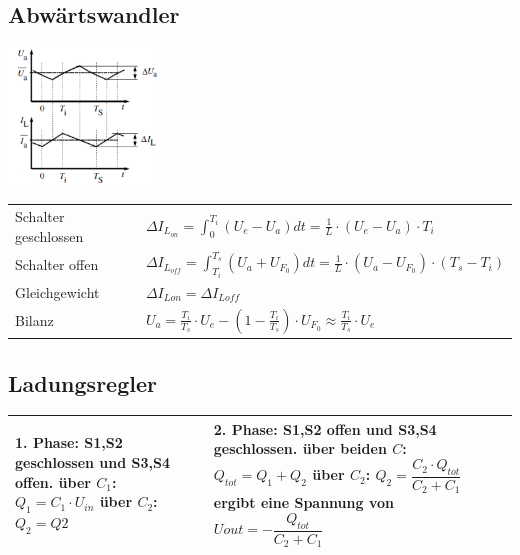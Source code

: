 \subsection{Abwärtswandler}
	\begin{minipage}{4cm}
		\includegraphics[width=4cm]{./images/schaltregler/06_buck-Verhalten}
	\end{minipage}
	\begin{minipage}{16cm}
		\begin{tabular}{p{100pt} p{250pt} }
			Schalter geschlossen & $\Delta I_{L_{on}} = \int_{0}^{T_i} (U_e - U_a) dt = \frac{1}{L} \cdot (U_e - U_a) \cdot T_i$ \\
			Schalter offen & $\Delta I_{L_{off}} = \int_{T_i}^{T_s}(U_a + U_{F_0}) dt = \frac{1}{L} \cdot (U_a - U_{F_0}) \cdot (T_s - T_i)$ \\
			Gleichgewicht & $\Delta I_{Lon} = \Delta I_{Loff}$\\
			Bilanz & $U_a = \frac{T_i}{T_s} \cdot U_e - \left(1-\frac{T_i}{T_s} \right) \cdot U_{F_0} \approx \frac{T_i}{T_s} \cdot U_e$\\
		\end{tabular}
	\end{minipage}
	
\subsection{Ladungsregler}
\begin{tabular}{p{250pt}p{250pt}}
\hline
	\textbf{1. Phase}: S1,S2 geschlossen und S3,S4 offen.\newline
	über $C_1$: $Q_1 = C_1 \cdot U_{in}$\newline
	über $C_2$: $Q_2 = Q2$
	
	&
	\textbf{2. Phase}: S1,S2 offen und S3,S4 geschlossen.\newline
	über beiden $C$: $Q_{tot} = Q_1+Q_2$\newline
	über $C_2$: $Q_2 = \dfrac{C_2 \cdot Q_{tot}}{C_2+C_1}$\newline
	ergibt eine Spannung von $Uout = -\dfrac{Q_{tot}}{C_2+C_1 }$\\	
\hline
\end{tabular}	\\

